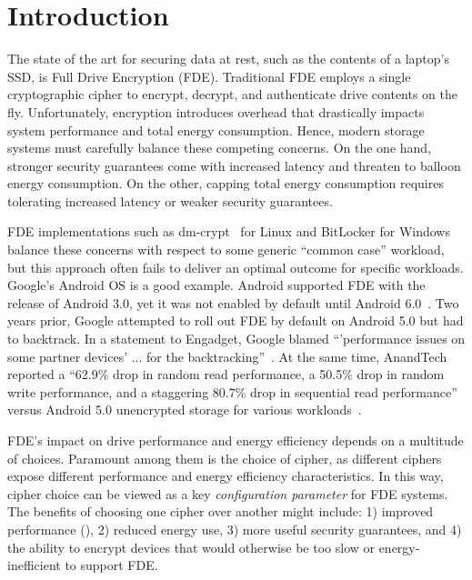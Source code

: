 \section{Introduction} \label{sec:introduction}

The state of the art for securing data at rest, such as the contents of a
laptop's SSD, is Full Drive Encryption (FDE). Traditional FDE employs a single
cryptographic cipher to encrypt, decrypt, and authenticate drive contents on the
fly. Unfortunately, encryption introduces overhead that drastically impacts
system performance and total energy consumption. Hence, modern storage systems
must carefully balance these competing concerns. On the one hand, stronger
security guarantees come with increased latency and threaten to balloon energy
consumption. On the other, capping total energy consumption requires tolerating
increased latency or weaker security guarantees.

FDE implementations such as dm-crypt~\cite{dmcrypt,DmC-Android} for Linux and
BitLocker for Windows~\cite{bitlocker} balance these concerns with respect to
some generic ``common case'' workload, but this approach often fails to deliver
an optimal outcome for specific workloads. Google's Android OS is a good
example. Android supported FDE with the release of Android 3.0, yet it was not
enabled by default until Android 6.0~\cite{android-M-mobile-motivation}. Two
years prior, Google attempted to roll out FDE by default on Android 5.0 but had
to backtrack. In a statement to Engadget, Google blamed ``'performance issues on
some partner devices' ... for the backtracking''~\cite{google-engadget}. At the
same time, AnandTech reported a ``62.9\% drop in random read performance, a
50.5\% drop in random write performance, and a staggering 80.7\% drop in
sequential read performance'' versus Android 5.0 unencrypted storage for various
workloads~\cite{android-M-mobile-motivation-2}.

FDE's impact on drive performance and energy efficiency depends on a multitude
of choices. Paramount among them is the choice of cipher, as different ciphers
expose different performance and energy efficiency characteristics. In this way,
cipher choice can be viewed as a key \emph{configuration parameter} for FDE
systems. The benefits of choosing one cipher over another might include: 1)
improved performance (), 2) reduced energy
use, 3) more useful security guarantees, and 4) the ability to encrypt devices
that would otherwise be too slow or energy-inefficient to support FDE.

